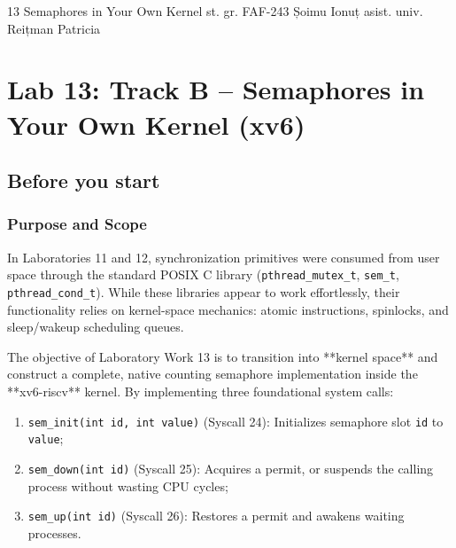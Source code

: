 \documentclass{labreport}
\begin{document}
\labtitle
    {13}
    {Semaphores in Your Own Kernel}
    {st. gr. FAF-243}
    {Șoimu Ionuț}
    {asist. univ.\\[0.15cm] Reițman Patricia}

\tableofcontents
\newpage

\section{Lab 13: Track B -- Semaphores in Your Own Kernel (xv6)}

\subsection{Before you start}

\subsubsection*{Purpose and Scope}
In Laboratories 11 and 12, synchronization primitives were consumed from user space through the standard POSIX C library (\texttt{pthread\_mutex\_t}, \texttt{sem\_t}, \texttt{pthread\_cond\_t}). While these libraries appear to work effortlessly, their functionality relies on kernel-space mechanics: atomic instructions, spinlocks, and sleep/wakeup scheduling queues.

The objective of Laboratory Work 13 is to transition into **kernel space** and construct a complete, native counting semaphore implementation inside the **xv6-riscv** kernel. By implementing three foundational system calls:
\begin{enumerate}[label=(\alph*), noitemsep]
    \item \texttt{sem\_init(int id, int value)} (Syscall 24): Initializes semaphore slot \texttt{id} to \texttt{value};
    \item \texttt{sem\_down(int id)} (Syscall 25): Acquires a permit, or suspends the calling process without wasting CPU cycles;
    \item \texttt{sem\_up(int id)} (Syscall 26): Restores a permit and awakens waiting processes.
\end{enumerate}
\end{document}
